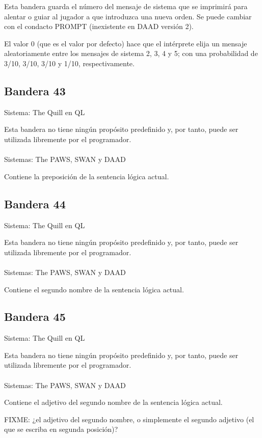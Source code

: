 \documentclass[11pt, a5paper]{article}
\newcommand{\quill}{\textsf{The Quill}\xspace}
\newcommand{\paw}{\textsf{The PAWS}\xspace}
\newcommand{\swan}{\textsf{SWAN}\xspace}
\newcommand{\daad}{\textsf{DAAD}\xspace}
\newcommand{\sistema}[1]{\noindent Sistema: #1 \nopagebreak}
\newcommand{\sistemas}[1]{\noindent Sistemas: #1 \nopagebreak}
\begin{document}
Esta bandera guarda el número del mensaje de sistema que se imprimirá para alentar o guiar al jugador a que introduzca una nueva orden. Se puede cambiar con el condacto PROMPT (inexistente en \daad versión 2).

El valor 0 (que es el valor por defecto) hace que el intérprete elija un mensaje aleatoriamente entre los mensajes de sistema 2, 3, 4 y 5; con una probabilidad de 3/10, 3/10, 3/10 y 1/10, respectivamente.

\subsection{Bandera 43}

\sistema{\quill en QL}

Esta bandera no tiene ningún propósito predefinido y, por tanto, puede ser utilizada libremente por el programador.
\\\ \\
\sistemas{\paw, \swan y \daad}

Contiene la preposición de la sentencia lógica actual.

\subsection{Bandera 44}

\sistema{\quill en QL}

Esta bandera no tiene ningún propósito predefinido y, por tanto, puede ser utilizada libremente por el programador.
\\\ \\
\sistemas{\paw, \swan y \daad}

Contiene el segundo nombre de la sentencia lógica actual.

\subsection{Bandera 45}

\sistema{\quill en QL}

Esta bandera no tiene ningún propósito predefinido y, por tanto, puede ser utilizada libremente por el programador.
\\\ \\
\sistemas{\paw, \swan y \daad}

Contiene el adjetivo del segundo nombre de la sentencia lógica actual.

FIXME: ¿el adjetivo del segundo nombre, o simplemente el segundo adjetivo (el que se escriba en segunda posición)?
\end{document}
